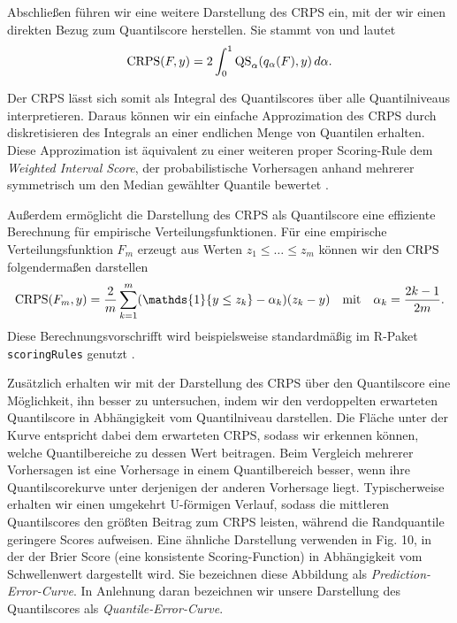 Abschließen führen wir eine weitere Darstellung des CRPS ein, mit der wir einen direkten Bezug zum Quantilscore herstellen. Sie stammt von \textcite{TameaQSCRPS} und lautet
\begin{equation} \label{eq:crps_qs}
\mathrm{CRPS}(F,y)=2\int_0^1 \mathrm{QS}_\alpha(q_\alpha(F),y)\,d\alpha.    
\end{equation}

Der CRPS lässt sich somit als Integral des Quantilscores über alle Quantilniveaus interpretieren. Daraus können wir ein einfache Approzimation des CRPS durch diskretisieren des Integrals an einer endlichen Menge von Quantilen erhalten. Diese Approzimation ist äquivalent zu einer weiteren proper Scoring-Rule dem \emph{Weighted Interval Score}, der probabilistische Vorhersagen anhand mehrerer symmetrisch um den Median gewählter Quantile bewertet \parencite{FakoorQSCRPS}.

Außerdem ermöglicht die Darstellung des CRPS als Quantilscore eine effiziente Berechnung für empirische Verteilungsfunktionen. Für eine empirische Verteilungsfunktion $F_m$ erzeugt aus Werten $z_1 \le \dotsc \le z_m$ können wir den $\mathrm{CRPS}$ folgendermaßen darstellen
\begin{equation} \label{eq:crps_qs_emp}  
\CRPS(F_m,y)=\frac{2}{m}\sum_{k=1}^m (\mathds{1}\{y \le z_k\}-\alpha_k) (z_k-y) \quad \text{mit} \quad \alpha_k=\frac{2k-1}{2m}.
\end{equation} Diese Berechnungsvorschrifft wird beispielsweise standardmäßig im R-Paket \texttt{scoringRules} genutzt \parencite{scoringRules}.




Zusätzlich erhalten wir mit der Darstellung des CRPS über den Quantilscore eine Möglichkeit, ihn besser zu untersuchen, indem wir den verdoppelten erwarteten Quantil\-score in Ab\-hängig\-keit vom Quantil\-niveau darstellen. Die Fläche unter der Kurve entspricht dabei dem erwarteten CRPS, sodass wir erkennen können, welche Quantilbereiche zu dessen Wert beitragen. Beim Vergleich mehrerer Vorhersagen ist eine Vorhersage in einem Quantilbereich besser, wenn ihre Quantilscorekurve unter derjenigen der anderen Vorhersage liegt. Typischerweise erhalten wir einen umgekehrt U-förmigen Verlauf, sodass die mittleren Quantilscores den größten Beitrag zum CRPS leisten, während die Randquantile geringere Scores aufweisen. Eine ähnliche Darstellung verwenden \textcite{Gneiting2007} in Fig. 10, in der der Brier Score (eine konsistente Scoring-Function) in Abhängigkeit vom Schwellenwert dargestellt wird. Sie bezeichnen diese Abbildung als \emph{Prediction-Error-Curve}. In Anlehnung daran bezeichnen wir unsere Darstellung des Quantilscores als \emph{Quantile-Error-Curve}.

